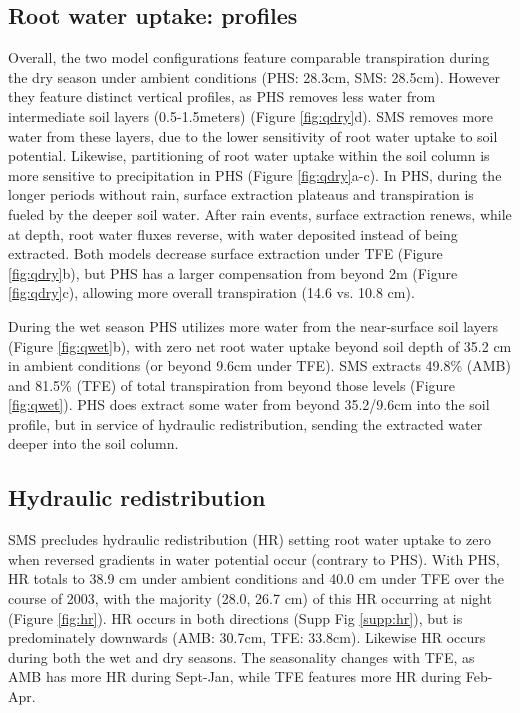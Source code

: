 \documentclass[draft,linenumbers]{agujournal}
\begin{document}
\subsection{Root water uptake: profiles}
    Overall, the two model configurations feature comparable transpiration during the dry season under ambient conditions (PHS: 28.3cm, SMS: 28.5cm).
    However they feature distinct vertical profiles, as PHS removes less water from intermediate soil layers (0.5-1.5meters) (Figure \ref{fig:qdry}d).
    SMS removes more water from these layers, due to the lower sensitivity of root water uptake to soil potential.
    Likewise, partitioning of root water uptake within the soil column is more sensitive to precipitation in PHS (Figure \ref{fig:qdry}a-c). In PHS, during the longer periods without rain, surface extraction plateaus and transpiration is fueled by the deeper soil water.
    After rain events, surface extraction renews, while at depth, root water fluxes reverse, with water deposited instead of being extracted.
    Both models decrease surface extraction under TFE (Figure \ref{fig:qdry}b), but PHS has a larger compensation from beyond 2m (Figure \ref{fig:qdry}c),
    allowing more overall transpiration (14.6 vs. 10.8 cm).
    
    During the wet season PHS utilizes more water from the near-surface soil layers (Figure \ref{fig:qwet}b), 
    with zero net root water uptake beyond soil depth of 35.2 cm in ambient conditions (or beyond 9.6cm under TFE).
    SMS extracts 49.8\% (AMB) and 81.5\% (TFE) of total transpiration from beyond those levels (Figure \ref{fig:qwet}). 
    PHS does extract some water from beyond 35.2/9.6cm into the soil profile, but in service of hydraulic redistribution, 
    sending the extracted water deeper into the soil column.
        
\subsection{Hydraulic redistribution}
    SMS precludes hydraulic redistribution (HR) setting root water uptake to zero when reversed gradients in water potential occur (contrary to PHS).
    With PHS, HR totals to 38.9 cm under ambient conditions and 40.0 cm under TFE over the course of 2003, with the majority (28.0, 26.7 cm) of this HR occurring at night (Figure \ref{fig:hr}).
    HR occurs in both directions (Supp Fig \ref{supp:hr}), but is predominately downwards (AMB: 30.7cm, TFE: 33.8cm).
    Likewise HR occurs during both the wet and dry seasons.
    The seasonality changes with TFE, as AMB has more HR during Sept-Jan, while TFE features more HR during Feb-Apr.
\end{document}
